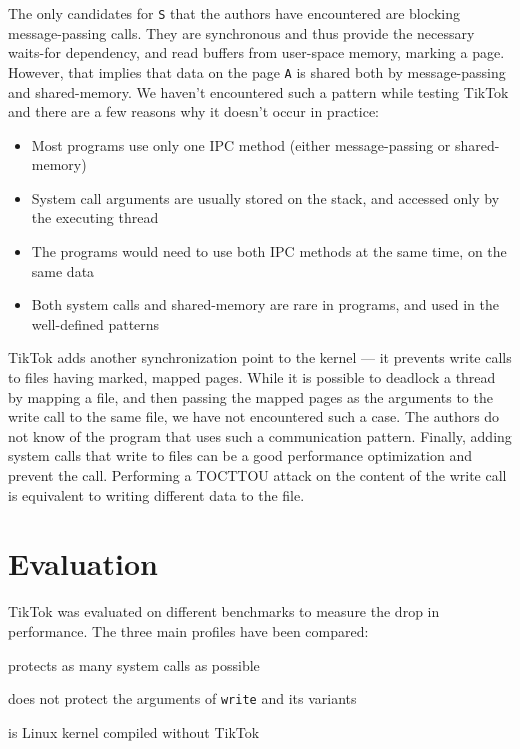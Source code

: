 \documentclass[conference]{IEEEtran}
\newcommand{\sysname}{TikTok}
\begin{document}
The only candidates for \texttt{S} that the authors have encountered are
blocking message-passing calls. They are synchronous and thus provide the
necessary waits-for dependency, and read buffers from user-space memory, marking
a page. However, that implies that data on the page \texttt{A} is shared both by
message-passing and shared-memory. We haven't encountered such a pattern while
testing \sysname{} and there are a few reasons why it doesn't occur in practice:

\begin{itemize}
  \item Most programs use only one IPC method (either message-passing or shared-memory)
  \item System call arguments are usually stored on the stack, and accessed only by the executing thread
  \item The programs would need to use both IPC methods at the same time, on the same data
  \item Both system calls and shared-memory are rare in programs, and used in the well-defined patterns
\end{itemize}

\sysname{} adds another synchronization point to the kernel --- it prevents write
calls to files having marked, mapped pages. While it is possible to deadlock
a thread by mapping a file, and then passing the mapped pages as the arguments to
the write call to the same file, we have not encountered such a case. The authors
do not know of the program that uses such a communication pattern. Finally, adding
system calls that write to files can be a good performance optimization and prevent
the call. Performing a TOCTTOU attack on the content of the write call is equivalent
to writing different data to the file.

\section{Evaluation}
\label{sec:evaluation}

\sysname{} was evaluated on different benchmarks to measure the drop in performance.
The three main profiles have been compared:
\begin{LaTeXdescription}
  \item[\sysname{} On] protects as many system calls as possible
  \item[\sysname{} Partial] does not protect the arguments of \texttt{write} and its variants
  \item[\sysname{} Off] is Linux kernel compiled without \sysname{}  
\end{LaTeXdescription}
\end{document}
